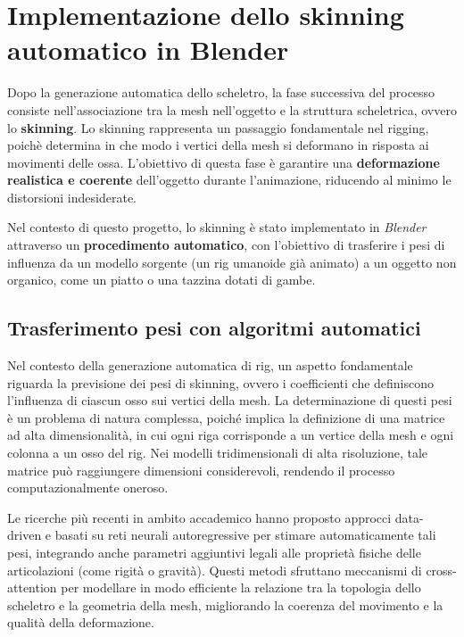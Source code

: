 \section{Implementazione dello skinning automatico in Blender}

Dopo la generazione automatica dello scheletro, la fase successiva del processo consiste nell'associazione tra la mesh nell'oggetto e la struttura scheletrica, ovvero lo \textbf{skinning}. Lo skinning rappresenta un passaggio fondamentale nel rigging, poichè determina in che modo i vertici della mesh si deformano in risposta ai movimenti delle ossa. L'obiettivo di questa fase è garantire una \textbf{deformazione realistica e coerente} dell'oggetto durante l'animazione, riducendo al minimo le distorsioni indesiderate.

Nel contesto di questo progetto, lo skinning è stato implementato in \textit{Blender} attraverso un \textbf{procedimento automatico}, con l'obiettivo di trasferire i pesi di influenza da un modello sorgente (un rig umanoide già animato) a un oggetto non organico, come un piatto o una tazzina dotati di gambe.

\subsection{Trasferimento pesi con algoritmi automatici}

Nel contesto della generazione automatica di rig, un aspetto fondamentale riguarda la previsione dei pesi di skinning, ovvero i coefficienti che definiscono l'influenza di ciascun osso sui vertici della mesh.
La determinazione di questi pesi è un problema di natura complessa, poiché implica la definizione di una matrice ad alta dimensionalità, in cui ogni riga corrisponde a un vertice della mesh e ogni colonna a un osso del rig. Nei modelli tridimensionali di alta risoluzione, tale matrice può raggiungere dimensioni considerevoli, rendendo il processo computazionalmente oneroso.

Le ricerche più recenti in ambito accademico hanno proposto approcci data-driven e basati su reti neurali autoregressive per stimare automaticamente tali pesi, integrando anche parametri aggiuntivi legali alle proprietà fisiche delle articolazioni (come rigità o gravità).
Questi metodi sfruttano meccanismi di cross-attention per modellare in modo efficiente la relazione tra la topologia dello scheletro e la geometria della mesh, migliorando la coerenza del movimento e la qualità della deformazione.


